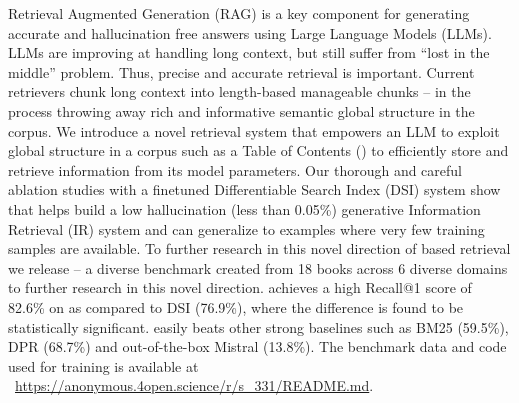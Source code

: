 Retrieval Augmented Generation (RAG) is a key component for generating accurate and hallucination free answers using Large Language Models (LLMs). LLMs are improving at handling long context, but still suffer from ``lost in the middle'' problem. Thus, precise and accurate retrieval is important. Current retrievers chunk long context into length-based manageable chunks -- in the process throwing away rich and informative semantic global structure in the corpus. We introduce a novel retrieval system {\sys} that empowers an LLM to exploit global structure in a corpus such as a Table of Contents ({\toc}) to efficiently store and retrieve information from its model parameters. Our thorough and careful ablation studies with a finetuned Differentiable Search Index (DSI) system show that {\toc} helps build a low hallucination (less than 0.05\%) generative Information Retrieval (IR) system and can generalize to examples where very few training samples are available. To further research in this novel direction of {\toc} based retrieval we release {\ben} -- a diverse benchmark created from 18 books across 6 diverse domains to further research in this novel direction. {\sys} achieves a high Recall@1 score of 82.6\% on {\ben} as compared to DSI (76.9\%), where the difference is found to be statistically significant. {\sys} easily beats other strong baselines such as BM25 (59.5\%), DPR (68.7\%) and out-of-the-box Mistral (13.8\%). The benchmark data and code used for training {\sys} is available at ~\url{https://anonymous.4open.science/r/s_331/README.md}.


